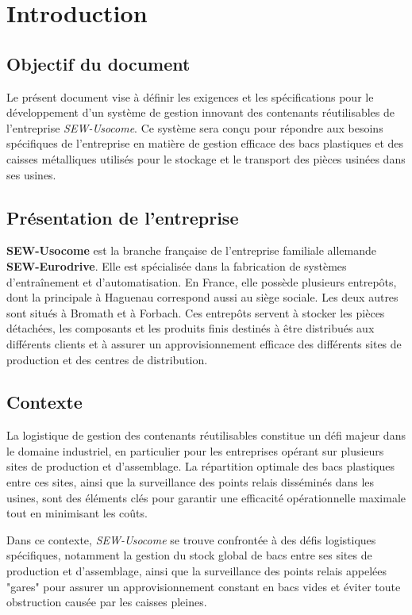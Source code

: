 \section{Introduction}

\subsection{Objectif du document}

Le présent document vise à définir les exigences et les spécifications
pour le développement d'un système de gestion innovant des contenants
réutilisables de l'entreprise \emph{SEW-Usocome}. Ce système sera
conçu pour répondre aux besoins spécifiques de l'entreprise en matière
de gestion efficace des bacs plastiques et des caisses métalliques
utilisés pour le stockage et le transport des pièces usinées dans ses
usines.

\subsection{Présentation de l'entreprise}

\textbf{SEW-Usocome} est la branche française de l'entreprise
familiale allemande \textbf{SEW-Eurodrive}. Elle est spécialisée dans
la fabrication de systèmes d'entraînement et d'automatisation. En
France, elle possède plusieurs entrepôts, dont la principale à
Haguenau correspond aussi au siège sociale. Les deux autres sont
situés à Bromath et à Forbach. Ces entrepôts servent à stocker les
pièces détachées, les composants et les produits finis destinés à être
distribués aux différents clients et à assurer un approvisionnement
efficace des différents sites de production et des centres de
distribution.

\subsection{Contexte}

La logistique de gestion des contenants réutilisables constitue un
défi majeur dans le domaine industriel, en particulier pour les
entreprises opérant sur plusieurs sites de production et
d'assemblage. La répartition optimale des bacs plastiques entre ces
sites, ainsi que la surveillance des points relais disséminés dans les
usines, sont des éléments clés pour garantir une efficacité
opérationnelle maximale tout en minimisant les coûts.


Dans ce contexte, \emph{SEW-Usocome} se trouve confrontée à des défis
logistiques spécifiques, notamment la gestion du stock global de bacs
entre ses sites de production et d'assemblage, ainsi que la
surveillance des points relais appelées "gares" pour assurer un
approvisionnement constant en bacs vides et éviter toute obstruction
causée par les caisses pleines.


